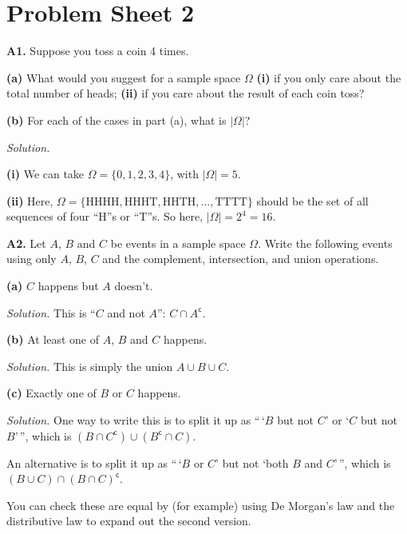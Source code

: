 \documentclass[
  a4paper,
]{book}
\theoremstyle{definition}
\theoremstyle{definition}
\theoremstyle{definition}
\theoremstyle{definition}
\theoremstyle{remark}
\begin{document}
\hypertarget{P2-solutions}{%
\section*{Problem Sheet 2}\label{P2-solutions}}

\textbf{A1.} Suppose you toss a coin 4 times.

\textbf{(a)} What would you suggest for a sample space \(\Omega\) \textbf{(i)} if you only care about the total number of heads; \textbf{(ii)} if you care about the result of each coin toss?

\textbf{(b)} For each of the cases in part (a), what is \(|\Omega|\)?

\begin{myanswers}
\emph{Solution.}

\textbf{(i)} We can take \(\Omega = \{0,1,2,3,4\}\), with \(|\Omega| = 5\).

\textbf{(ii)} Here, \(\Omega = \{ \text{HHHH}, \text{HHHT}, \text{HHTH},\dots, \text{TTTT} \}\) should be the set of all sequences of four ``H''s or ``T''s. So here, \(|\Omega| = 2^4 = 16\).

\end{myanswers}

\textbf{A2.} Let \(A\), \(B\) and \(C\) be events in a sample space \(\Omega\). Write the following events using only \(A\), \(B\), \(C\) and the complement, intersection, and union operations.

\textbf{(a)} \(C\) happens but \(A\) doesn't.

\begin{myanswers}
\emph{Solution.} This is ``\(C\) and not \(A\)'': \(C\cap A^{\mathsf{c}}\).

\end{myanswers}

\textbf{(b)} At least one of \(A\), \(B\) and \(C\) happens.

\begin{myanswers}
\emph{Solution.} This is simply the union \(A \cup B\cup C\).

\end{myanswers}

\textbf{(c)} Exactly one of \(B\) or \(C\) happens.

\begin{myanswers}
\emph{Solution.} One way to write this is to split it up as ``\,`\(B\) but not \(C\)' or `\(C\) but not \(B\)'\,'', which is \((B \cap C^{\mathsf{c}}) \cup (B^{\mathsf{c}} \cap C)\).

An alternative is to split it up as ``\,`\(B\) or \(C\)' but not `both \(B\) and \(C\)'\,'', which is \((B \cup C) \cap (B\cap C)^{\mathsf{c}}\).

You can check these are equal by (for example) using De Morgan's law and the distributive law to expand out the second version.

\end{myanswers}
\end{document}
